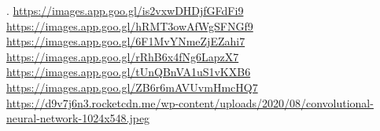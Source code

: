 \documentclass{article}
\begin{document}
\vspace{30px}
\begin{thebibliography}
    . \href{https://images.app.goo.gl/is2vxwDHDjfGFdFi9}{https://images.app.goo.gl/is2vxwDHDjfGFdFi9}
    \href{https://images.app.goo.gl/hRMT3owAfWgSFNGf9}{https://images.app.goo.gl/hRMT3owAfWgSFNGf9}
    \href{ https://images.app.goo.gl/6F1MvYNmeZjEZahi7}{https://images.app.goo.gl/6F1MvYNmeZjEZahi7}
    \href{ https://images.app.goo.gl/rRhB6x4fNg6LapzX7}{https://images.app.goo.gl/rRhB6x4fNg6LapzX7}
    \href{ https://images.app.goo.gl/tUnQBnVA1uS1vKXB6}{https://images.app.goo.gl/tUnQBnVA1uS1vKXB6}
    \href{ https://images.app.goo.gl/ZB6r6mAVUvmHmcHQ7}{https://images.app.goo.gl/ZB6r6mAVUvmHmcHQ7}
    \href{ https://d9v7j6n3.rocketcdn.me/wp-content/uploads/2020/08/convolutional-neural-network-1024x548.jpeg}{https://d9v7j6n3.rocketcdn.me/wp-content/uploads/2020/08/convolutional-neural-network-1024x548.jpeg}
   \end{thebibliography}
\end{document}
